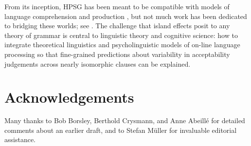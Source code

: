 \documentclass[output=paper
                ,modfonts
                ,nonflat
	        ,collection
	        ,collectionchapter
	        ,collectiontoclongg
 	        ,biblatex
                ,babelshorthands
                ,newtxmath
                ,draftmode
                ,colorlinks, citecolor=brown
]{./langsci/langscibook}
\begin{document}
From its inception, HPSG has been meant to be compatible with models of language comprehension and production \citep{sagser,Sag:Wasow:ta,Sag:Wasow:ta2}, but not much work has been dedicated to bridging these worlds; see . The challenge that island effects posit to any theory of grammar is central to linguistic theory and cognitive science: how to integrate theoretical linguistics and psycholinguistic models of on-line language processing so that fine-grained predictions about variability in acceptability judgements across nearly isomorphic clauses can be explained.


 
\section*{Acknowledgements}

Many thanks to Bob Borsley, Berthold Crysmann, and Anne Abeillé for
detailed comments about an earlier draft, and to Stefan Müller for
invaluable editorial assistance.

{\sloppy
\printbibliography[heading=subbibliography,notkeyword=this] 
}
\end{document}
